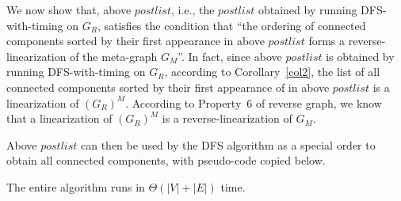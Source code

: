\begin{minipage}{0.8\textwidth}
	\xxx
	\xxx
	\xxx
	\xxx
	\xxx
\end{minipage}

We now show that, above $postlist$, i.e., the $postlist$ obtained by running DFS-with-timing on $G_R$,
satisfies the condition that ``the ordering of connected components sorted by their first appearance in above
$postlist$ forms a reverse-linearization of the meta-graph $G_M$''.
In fact, since above $postlist$ is obtained by running DFS-with-timing on $G_R$,
according to Corollary~\ref{col2}, 
the list of all connected components sorted by their first appearance of in above $postlist$ is a linearization of $(G_R)^M$.
According to Property~6 of reverse graph, we know that a linearization of $(G_R)^M$ is a reverse-linearization of $G_M$.

Above $postlist$ can then be used by the DFS algorithm as a special order to obtain all connected components, with pseudo-code copied below.

\begin{minipage}{0.8\textwidth}
	\xxx
	\xxx
	\xxx
	\xxx
	\xxx
	\xxx
	\xxx
	\xxx
	\xxx
\end{minipage}

\begin{minipage}{0.8\textwidth}
	\xxx
	\xxx
	\xxx
	\xxx
	\xxx
	\xxx
\end{minipage}


The entire algorithm runs in $\Theta(|V| + |E|)$ time.
